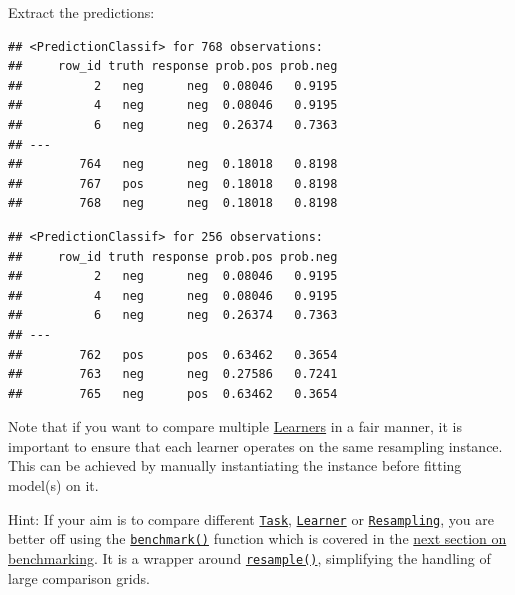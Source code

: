 \documentclass[]{scrbook}
\newenvironment{Shaded}{\begin{snugshade}}{\end{snugshade}}
\newcommand{\CommentTok}[1]{\textcolor[rgb]{0.56,0.35,0.01}{\textit{#1}}}
\newcommand{\DecValTok}[1]{\textcolor[rgb]{0.00,0.00,0.81}{#1}}
\newcommand{\KeywordTok}[1]{\textcolor[rgb]{0.13,0.29,0.53}{\textbf{#1}}}
\newcommand{\NormalTok}[1]{#1}
\newcommand{\OperatorTok}[1]{\textcolor[rgb]{0.81,0.36,0.00}{\textbf{#1}}}
\renewenvironment{Shaded} {\begin{snugshade}\small} {\end{snugshade}}
\begin{document}
Extract the predictions:

\begin{Shaded}
\end{Shaded}

\begin{verbatim}
## <PredictionClassif> for 768 observations:
##     row_id truth response prob.pos prob.neg
##          2   neg      neg  0.08046   0.9195
##          4   neg      neg  0.08046   0.9195
##          6   neg      neg  0.26374   0.7363
## ---                                        
##        764   neg      neg  0.18018   0.8198
##        767   pos      neg  0.18018   0.8198
##        768   neg      neg  0.18018   0.8198
\end{verbatim}

\begin{Shaded}
\end{Shaded}

\begin{verbatim}
## <PredictionClassif> for 256 observations:
##     row_id truth response prob.pos prob.neg
##          2   neg      neg  0.08046   0.9195
##          4   neg      neg  0.08046   0.9195
##          6   neg      neg  0.26374   0.7363
## ---                                        
##        762   pos      pos  0.63462   0.3654
##        763   neg      neg  0.27586   0.7241
##        765   neg      pos  0.63462   0.3654
\end{verbatim}

Note that if you want to compare multiple \protect\hyperlink{learners}{Learners} in a fair manner, it is important to ensure that each learner operates on the same resampling instance.
This can be achieved by manually instantiating the instance before fitting model(s) on it.

Hint: If your aim is to compare different \href{https://mlr3.mlr-org.com/reference/Task.html}{\texttt{Task}}, \href{https://mlr3.mlr-org.com/reference/Learner.html}{\texttt{Learner}} or \href{https://mlr3.mlr-org.com/reference/Resampling.html}{\texttt{Resampling}}, you are better off using the \href{https://mlr3.mlr-org.com/reference/benchmark.html}{\texttt{benchmark()}} function which is covered in the \protect\hyperlink{benchmarking}{next section on benchmarking}.
It is a wrapper around \href{https://mlr3.mlr-org.com/reference/resample.html}{\texttt{resample()}}, simplifying the handling of large comparison grids.
\end{document}
